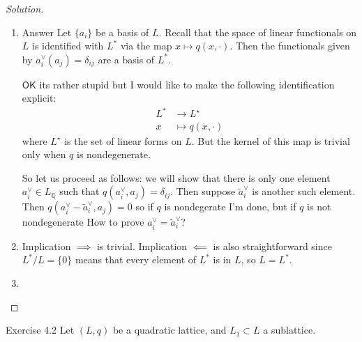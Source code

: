 \begin{proof}[Solution]\leavevmode
\begin{enumerate}[label=\alph*.]
	\item \begin{idea3}{Answer}\leavevmode
			Let $\{a_i\}$ be a basis of $L$. Recall that the space of linear functionals on $L$ is identified with  $L^*$ via the map $x\mapsto q(x,\cdot )$. Then the functionals given by $a^\vee_i(a_j)= \delta_{ij}$ are a basis of $L^*$.
		\end{idea3}
\vspace{1em}

		$\mathsf{OK}$ its rather stupid but I would like to make the following identification explicit:
		\begin{align*}
			L^* &\longrightarrow L^\star \\
			x &\longmapsto q(x,\cdot )
		\end{align*}
		where $L^\star$  is the set of linear forms on $L$. {\color{1}But the kernel of this map is trivial only when $q$ is nondegenerate.}

		So let us proceed as follows: we will show that there is only one element $a^\vee_i\in L_\mathbb{Q}$ such that $q(a^\vee_i,a_j)=\delta_{ij}$. Then suppose $\tilde{a}^\vee _i$ is another such element. Then $q(a^\vee_i-\tilde{a}^\vee_i,a_j)=0$ so if $q$ is nondegerate I'm done, but if $q$ is not nondegenerate {\color{1}How to prove $a^\vee_i=\tilde{a}^\vee_i$?}

\iffalse
		I want to find a set of generators for elements in $L^*$. Suppose $x\in L^*$. This means, first, that $x$ is a rational linear combination of the generators of  $L$, that is, $x=q_1a_1+\ldots +q_na_n$ where $L=\left<a_1\right> \oplus \ldots \left<a_n\right> $. And also 
		\[q(x,\ell)=q\left( \sum_{i}q_ia_i,\ell \right) =\sum_{i}q_iq(a_i,\ell)\in\mathbb{Z}\]
		where of course $q(a_i,\ell)$ are also integers. So in the end we have that
		\[q(x,\ell)\text{ is a rational linear combination of integers that is an integer} \]
		So maybe characterize $q$. What is it? Isn't $q\longleftrightarrow \big(q(a_i,a_j\big)$? Then I expand further to get
		\[q(x,\ell)=\sum_{i,j}q_i\ell_jq(a_i,a_j)\in\mathbb{Z}\]

	Consider the canonical identification of
		\begin{align*}
			L &\longrightarrow L^\star\\
			x &\longmapsto q(x,\cdot)
		\end{align*}
		where $L^\star$  is the set of linear forms on $L$. I expect to find an identification  $L^*\cong L^\star$. What exactly is $q(x,\ell)?$. Since $x=\sum_{i}q_ie_i$ with $q_i\in\mathbb{Q}$, we\fi

	\item Implication  $\implies $ is trivial. Implication $\impliedby$ is also straightforward since $L^* /L=\{0\}$ means that every element of $L^*$ is in $L$, so $L=L^*$.

	\item 
\end{enumerate}	
\end{proof}

\begin{idea5}{Exercise 4.2}\leavevmode
	Let $(L,q)$ be a quadratic lattice, and $L_1\subset L$ a sublattice.
\end{idea5}


